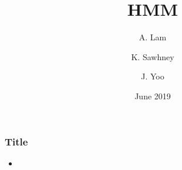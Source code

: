 \documentclass{beamer}
\title[]{HMM}
\author[Lam, Sawhney, Yoo]{A. Lam \and K. Sawhney \and J. Yoo}
\date[June 2019]{June 2019}
\begin{document}
\frame{\titlepage}

\begin{frame}
\frametitle{Title}
    \begin{itemize}
        \item
    \end{itemize}
\end{frame}
\end{document}
